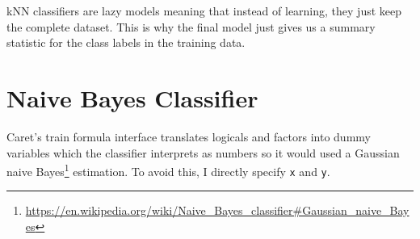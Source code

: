 \documentclass[
  notitlepage]{book}
\DeclareRobustCommand{\href}[2]{#2\footnote{\url{#1}}}
\begin{document}
kNN classifiers are lazy models meaning that instead of learning, they just
keep the complete dataset. This is why the final model just gives us a summary statistic for the class labels in the training data.

\hypertarget{naive-bayes-classifier}{%
\section{Naive Bayes Classifier}\label{naive-bayes-classifier}}

Caret's train formula interface translates logicals and factors into dummy
variables which the classifier interprets as numbers so it would used a \href{https://en.wikipedia.org/wiki/Naive_Bayes_classifier\#Gaussian_naive_Bayes}{Gaussian naive Bayes} estimation. To avoid this, I directly specify \texttt{x} and \texttt{y}.
\end{document}
